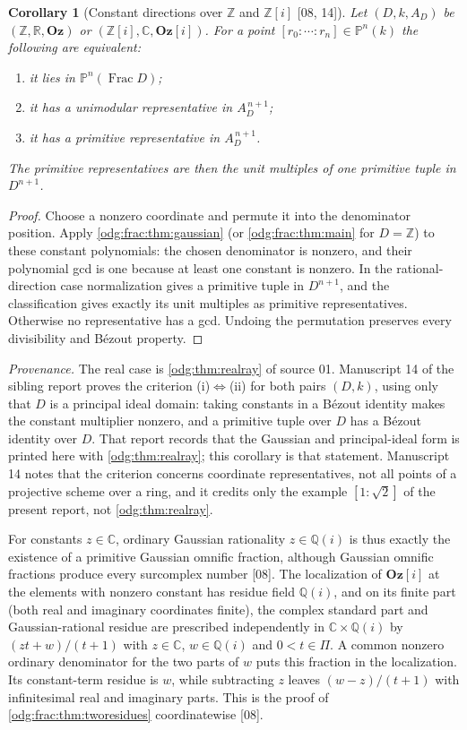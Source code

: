 \documentclass[11pt,oneside]{article}
\numberwithin{equation}{section}
\newtheorem{corollary}[corollary]{Corollary}
\theoremstyle{definition}
\theoremstyle{remark}
\newcommand{\Oz}{\mathbf{Oz}}
\newcommand{\Z}{\mathbb Z}
\newcommand{\Q}{\mathbb Q}
\newcommand{\R}{\mathbb R}
\newcommand{\C}{\mathbb C}
\newcommand{\Frac}{\operatorname{Frac}}
\newcommand{\src}[1]{\textup{\textsf{\small[#1]}}}
\newcommand{\status}[1]{\par\smallskip\noindent\textit{Provenance.} #1\par\smallskip}
\newcommand{\Og}{\Oz[i]}
\begin{document}
\begin{corollary}[Constant directions over $\Z$ and $\Z{[i]}$ \src{08, 14}]\label{odg:frac:cor:gaussiandirections}
Let $(D,k,A_D)$ be $(\Z,\R,\Oz)$ or $(\Z[i],\C,\Og)$. For a point
$[r_0:\cdots:r_n]\in\mathbb P^n(k)$ the following are equivalent:
\begin{enumerate}[label=\textup{(\roman*)},leftmargin=*]
\item it lies in $\mathbb P^n(\Frac D)$;
\item it has a unimodular representative in $A_D^{\,n+1}$;
\item it has a primitive representative in $A_D^{\,n+1}$.
\end{enumerate}
The primitive representatives are then the unit multiples of one primitive
tuple in $D^{n+1}$.
\end{corollary}
\begin{proof}
Choose a nonzero coordinate and permute it into the denominator position.
Apply \cref{odg:frac:thm:gaussian} (or \cref{odg:frac:thm:main} for $D=\Z$)
to these constant polynomials: the chosen denominator is nonzero, and
their polynomial gcd is one because at least one constant is nonzero.
In the rational-direction case normalization gives a primitive tuple in
$D^{n+1}$, and the classification gives exactly its unit multiples as
primitive representatives. Otherwise no representative has a gcd.
Undoing the permutation preserves every divisibility and B\'ezout property.
\end{proof}

\status{The real case is \cref{odg:thm:realray} of source 01. Manuscript 14 of
the sibling report proves the criterion (i)$\Leftrightarrow$(ii) for both pairs
$(D,k)$, using only that $D$ is a principal ideal domain: taking constants in a
B\'ezout identity makes the constant multiplier nonzero, and a primitive tuple
over $D$ has a B\'ezout identity over $D$. That report records that the Gaussian
and principal-ideal form is printed here with \cref{odg:thm:realray}; this
corollary is that statement. Manuscript 14 notes that the criterion concerns
coordinate representatives, not all points of a projective scheme over a ring,
and it credits only the example $[1:\sqrt2]$ of the present report, not
\cref{odg:thm:realray}.}

For constants $z\in\C$, ordinary Gaussian rationality $z\in\Q(i)$ is thus exactly
the existence of a primitive Gaussian omnific fraction, although Gaussian
omnific fractions produce every surcomplex number \src{08}. The localization of
$\Og$ at the elements with nonzero constant has residue field $\Q(i)$, and on its
finite part (both real and imaginary coordinates finite), the complex
standard part and Gaussian-rational residue are prescribed independently
in $\C\times\Q(i)$ by $(zt+w)/(t+1)$ with $z\in\C$, $w\in\Q(i)$ and
$0<t\in\Pi$. A common nonzero ordinary denominator for the two parts
of $w$ puts this fraction in the localization. Its constant-term residue
is $w$, while subtracting $z$ leaves $(w-z)/(t+1)$ with infinitesimal
real and imaginary parts. This is the proof of
\cref{odg:frac:thm:tworesidues} coordinatewise \src{08}.
\end{document}
